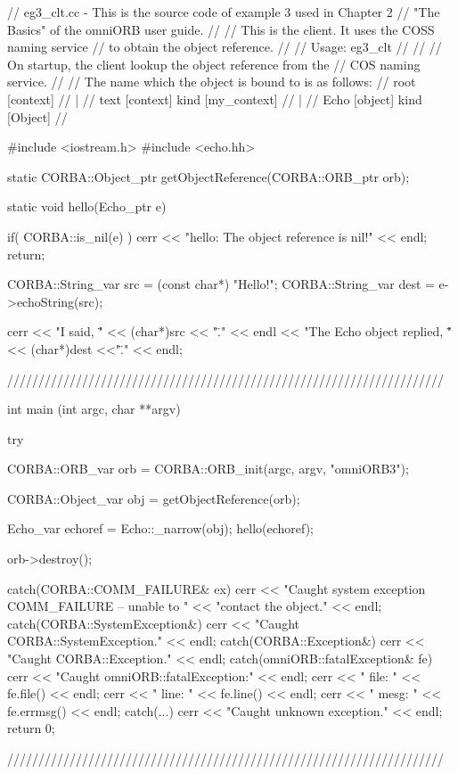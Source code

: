\documentclass[11pt,twoside,a4paper]{book}
\begin{document}
\begin{cxxlisting}
// eg3_clt.cc - This is the source code of example 3 used in Chapter 2
//              "The Basics" of the omniORB user guide.
//
//              This is the client. It uses the COSS naming service
//              to obtain the object reference.
//
// Usage: eg3_clt
//
//
//        On startup, the client lookup the object reference from the
//        COS naming service.
//
//        The name which the object is bound to is as follows:
//              root  [context]
//               |
//              text  [context] kind [my_context]
//               |
//              Echo  [object]  kind [Object]
//

#include <iostream.h>
#include <echo.hh>

static CORBA::Object_ptr getObjectReference(CORBA::ORB_ptr orb);

static void hello(Echo_ptr e)
{
  if( CORBA::is_nil(e) ) {
    cerr << "hello: The object reference is nil!\n" << endl;
    return;
  }

  CORBA::String_var src  = (const char*) "Hello!";
  CORBA::String_var dest = e->echoString(src);

  cerr << "I said, \"" << (char*)src << "\"." << endl
       << "The Echo object replied, \"" << (char*)dest <<"\"." << endl;
}

//////////////////////////////////////////////////////////////////////

int
main (int argc, char **argv) 
{
  try {
    CORBA::ORB_var orb = CORBA::ORB_init(argc, argv, "omniORB3");

    CORBA::Object_var obj = getObjectReference(orb);

    Echo_var echoref = Echo::_narrow(obj);
    hello(echoref);

    orb->destroy();
  }
  catch(CORBA::COMM_FAILURE& ex) {
    cerr << "Caught system exception COMM_FAILURE -- unable to "
         << "contact the object." << endl;
  }
  catch(CORBA::SystemException&) {
    cerr << "Caught CORBA::SystemException." << endl;
  }
  catch(CORBA::Exception&) {
    cerr << "Caught CORBA::Exception." << endl;
  }
  catch(omniORB::fatalException& fe) {
    cerr << "Caught omniORB::fatalException:" << endl;
    cerr << "  file: " << fe.file() << endl;
    cerr << "  line: " << fe.line() << endl;
    cerr << "  mesg: " << fe.errmsg() << endl;
  }
  catch(...) {
    cerr << "Caught unknown exception." << endl;
  }
  return 0;
}

//////////////////////////////////////////////////////////////////////


\end{cxxlisting}
\end{document}
